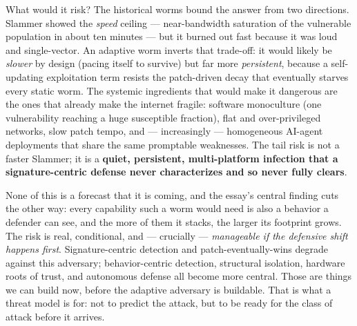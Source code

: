 \documentclass[11pt,a4paper]{article}
\begin{document}
What would it risk? The historical worms bound the answer from two directions. Slammer showed the \emph{speed} ceiling --- near-bandwidth saturation of the vulnerable population in about ten minutes --- but it burned out fast because it was loud and single-vector. An adaptive worm inverts that trade-off: it would likely be \emph{slower} by design (pacing itself to survive) but far more \emph{persistent}, because a self-updating exploitation term resists the patch-driven decay that eventually starves every static worm. The systemic ingredients that would make it dangerous are the ones that already make the internet fragile: software monoculture (one vulnerability reaching a huge susceptible fraction), flat and over-privileged networks, slow patch tempo, and --- increasingly --- homogeneous AI-agent deployments that share the same promptable weaknesses. The tail risk is not a faster Slammer; it is a \textbf{quiet, persistent, multi-platform infection that a signature-centric defense never characterizes and so never fully clears}.

None of this is a forecast that it is coming, and the essay's central finding cuts the other way: every capability such a worm would need is also a behavior a defender can see, and the more of them it stacks, the larger its footprint grows. The risk is real, conditional, and --- crucially --- \emph{manageable if the defensive shift happens first}. Signature-centric detection and patch-eventually-wins degrade against this adversary; behavior-centric detection, structural isolation, hardware roots of trust, and autonomous defense all become more central. Those are things we can build now, before the adaptive adversary is buildable. That is what a threat model is for: not to predict the attack, but to be ready for the class of attack before it arrives.
\end{document}
